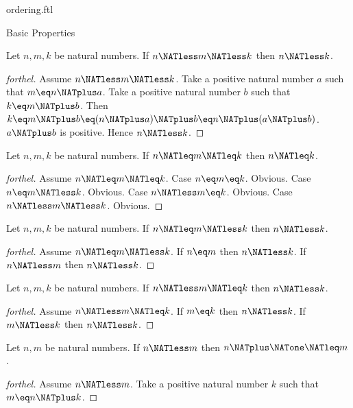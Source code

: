 \documentclass{naproche-library}
\begin{document}
\begin{smodule}[title=The Standard Ordering of the Natural Numbers]{ordering.ftl}
\begin{sfragment}{Basic Properties}
  \begin{proposition}[forthel,id=ARITHMETIC_04_6413905244979200]
    Let $n, m, k$ be natural numbers.
    If $n \NATless m \NATless k$ then $n \NATless k$.
  \end{proposition}
  \begin{proof}[forthel]
    Assume $n \NATless m \NATless k$.
    Take a positive natural number $a$ such that $m \eq n \NATplus a$.
    Take a positive natural number $b$ such that $k \eq m \NATplus b$.
    Then $k
      \eq m \NATplus b
      \eq (n \NATplus a) \NATplus b
      \eq n \NATplus (a \NATplus b)$.
    $a \NATplus b$ is positive.
    Hence $n \NATless k$.
  \end{proof}

  \begin{proposition}[forthel,id=ARITHMETIC_04_5480385953660928]
    Let $n, m, k$ be natural numbers.
    If $n \NATleq m \NATleq k$ then $n \NATleq k$.
  \end{proposition}
  \begin{proof}[forthel]
    Assume $n \NATleq m \NATleq k$.
    Case $n \eq m \eq k$. Obvious.
    Case $n \eq m \NATless k$. Obvious.
    Case $n \NATless m \eq k$. Obvious.
    Case $n \NATless m \NATless k$. Obvious.
  \end{proof}

  \begin{proposition}[forthel,id=ARITHMETIC_04_5098403656630272]
    Let $n, m, k$ be natural numbers.
    If $n \NATleq m \NATless k$ then $n \NATless k$.
  \end{proposition}
  \begin{proof}[forthel]
    Assume $n \NATleq m \NATless k$.
    If $n \eq m$ then $n \NATless k$.
    If $n \NATless m$ then $n \NATless k$.
  \end{proof}

  \begin{proposition}[forthel,id=ARITHMETIC_04_4809599527944192]
    Let $n, m, k$ be natural numbers.
    If $n \NATless m \NATleq k$ then $n \NATless k$.
  \end{proposition}
  \begin{proof}[forthel]
    Assume $n \NATless m \NATleq k$.
    If $m \eq k$ then $n \NATless k$.
    If $m \NATless k$ then $n \NATless k$.
  \end{proof}

  \begin{proposition}[forthel,id=ARITHMETIC_04_8584998051381248]
    Let $n, m$ be natural numbers.
    If $n \NATless m$ then $n \NATplus \NATone \NATleq m$.
  \end{proposition}
  \begin{proof}[forthel]
    Assume $n \NATless m$.
    Take a positive natural number $k$ such that $m \eq n \NATplus k$.


\end{proof}
\end{sfragment}
\end{smodule}
\end{document}

